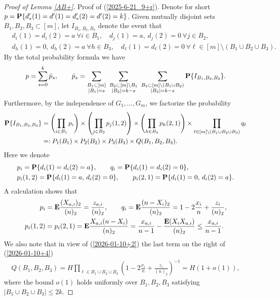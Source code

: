 \documentclass[10pt,a4paper]{amsart}
\newcommand{\E}{{\bf{E}}}
\newcommand{\PP}{{\bf{P}}}
\begin{document}
\begin{proof}[ Proof of Lemma \ref{AB+}]
Proof of (\ref{2025-6-21_9+r}). Denote for short
$p=\PP\{d'_*(1)=d'(1)=d'_*(2)=d'(2)=k\}$.
Given mutually disjoint sets $B_1,B_2,B_3\subset [m]$, let 
$I_{B_1,B_2,B_3}$
denote the event that
\begin{align*}
&
d_i(1)=d_i(2)=a
\
 \forall i\in B_1,
\quad
d_j(1)=a, 
\
d_j(2)=0
\
 \forall j\in B_2,
\\
&
d_h(1)=0, 
\ 
d_h(2)=a
\
 \forall h\in B_3,
\quad
d_\ell(1)=d_\ell(2)=0
\
\forall \ell\in [m]\setminus (B_1\cup B_2\cup B_3).
 \end{align*}
By the total probability formula we have 
\begin{align*}
p
=
\sum_{s=0}^k{\bar p}_s,
\qquad
{\bar p}_s
=
\sum_
{\substack{B_1\subset [m]\\ |B_1|=s}}
\
\sum_{\substack{B_2\subset [m]\setminus B_1\\
|B_2|=k-s}}
\
\sum_{\substack{B_3\subset [m]\setminus (B_1\cup B_2)\\
|B_3|=k-s}}
\PP\{I_{B_1,B_2,B_3}\}.
\end{align*} 
Furthermore, by the independence of $G_1,\dots, G_m$,
we factorize the probability 
\begin{align}
\nonumber
\PP\{I_{B_1,B_2,B_3}\}
&=
\left(
\prod_{i\in B_1}
p_i
\right)
\times
\left(
\prod_{j\in B_2}p_j(1,2)
\right)
\times
\left(
\prod_{h\in B_3}p_h(2,1)
\right)
\times
\prod_{\ell\in [m]\setminus(B_1\cup B_2\cup B_3)}
q_\ell
\\
\label{2026-01-10+4}
&
=:
P_1(B_1)
\times
P_2(B_2)
\times
P_3(B_3)
\times
Q(B_1,B_2,B_3).
\end{align}
Here we denote
 \begin{align*}
&
p_i=\PP\{d_i(1)=d_i(2)=a\},
\qquad
q_i=\PP\{d_i(1)=d_i(2)=0\},
\\
&
p_i(1,2)=\PP\{d_i(1)=a, \,d_i(2)=0\},
\qquad
p_i(2,1)=\PP\{d_i(1)=0,\, d_i(2)=a\}.
\end{align*}
A calculation shows that
\begin{align*}
p_i
&
=
\E \frac{(X_{a,i})_2}{(n)_2}=\frac{z_{a,i}}{(n)_2},
\qquad
q_i
=
\E\frac{(n-X_i)_2}{(n)_2}
=1-2\frac{x_i}{n}+\frac{z_i}{(n)_2},
\\
p_i(1,2)
&
=
p_i(2,1)
=
\E\frac{X_{a,i}(n-X_i)}{(n)_2}
=
\frac{x_{a,i}}{n-1}-\frac{\E (X_iX_{a,i})}{(n)_2}
\le 
\frac{x_{a,i}}{n-1}.
\end{align*}
We also note that in view of (\ref{2026-01-10+2})  the last term on the right of (\ref{2026-01-10+4})
\begin{align}
\label{2026-01-12+5}
Q(B_1,B_2,B_3)
=
H\prod_{\ell\in B_1\cup B_2\cup B_3}
\left(
1-2\frac{x_i}{n}+\frac{z_i}{(n)_2}
\right)^{-1}
=
H
(1+o(1)),
\end{align}
where the bound $o(1)$ holds
uniformly over $B_1,B_2,B_3$ satisfying $|B_1\cup B_2\cup B_3|\le 2k$.




\end{proof}
\end{document}
